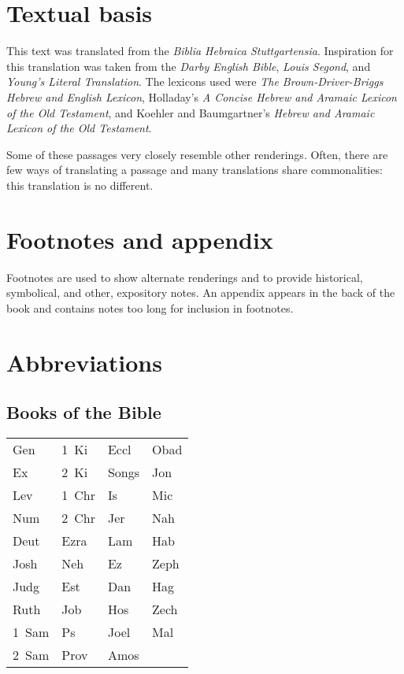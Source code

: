\section{Textual basis}
This text was translated from the \textit{Biblia Hebraica Stuttgartensia}. Inspiration for this translation was taken from the \textit{Darby English Bible}, \textit{Louis Segond}, and \textit{Young's Literal Translation}. The lexicons used were \textit{The Brown-Driver-Briggs Hebrew and English Lexicon}, Holladay's \textit{A Concise Hebrew and Aramaic Lexicon of the Old Testament}, and Koehler and Baumgartner's \textit{Hebrew and Aramaic Lexicon of the Old Testament}.

Some of these passages very closely resemble other renderings. Often, there are few ways of translating a passage and many translations share commonalities: this translation is no different.

\section{Footnotes and appendix}
Footnotes are used to show alternate renderings and to provide historical, symbolical, and other, expository notes. An appendix appears in the back of the book and contains notes too long for inclusion in footnotes.

\section{Abbreviations}
\subsection{Books of the Bible}
\begin{table}[!h]
    \centering
    \setlength\tabcolsep{1.75em}
    \begin{tabular}{llll}
        Gen   & 1~Ki  & Eccl  & Obad \\
        Ex    & 2~Ki  & Songs & Jon  \\
        Lev   & 1~Chr & Is    & Mic  \\
        Num   & 2~Chr & Jer   & Nah  \\
        Deut  & Ezra  & Lam   & Hab  \\
        Josh  & Neh   & Ez    & Zeph \\
        Judg  & Est   & Dan   & Hag  \\
        Ruth  & Job   & Hos   & Zech \\
        1~Sam & Ps    & Joel  & Mal  \\
        2~Sam & Prov  & Amos  & ~
    \end{tabular}
\end{table}

